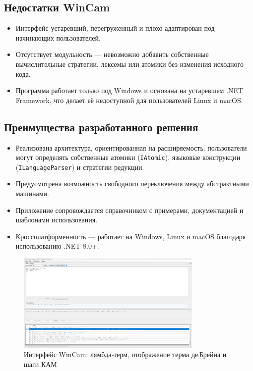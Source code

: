 \begin{itemize}
\subsection*{Недостатки WinCam}
\begin{itemize}
  \item Интерфейс устаревший, перегруженный и плохо адаптирован под начинающих пользователей.
  \item Отсутствует модульность — невозможно добавить собственные вычислительные стратегии, лексемы или атомики без изменения исходного кода.
  \item Программа работает только под Windows и основана на устаревшем .NET Framework, что делает её недоступной для пользователей Linux и macOS.
\end{itemize}

\subsection*{Преимущества разработанного решения}
\begin{itemize}
  \item Реализована архитектура, ориентированная на расширяемость: пользователи могут определять собственные атомики (\texttt{IAtomic}), языковые конструкции \\(\texttt{ILanguageParser}) и стратегии редукции.
  \item Предусмотрена возможность свободного переключения между абстрактными машинами.
  \item Приложение сопровождается справочником с примерами, документацией и шаблонами использования.
  \item Кроссплатформенность — работает на Windows, Linux и macOS благодаря использованию .NET 8.0+.
\end{itemize}

\begin{figure}[h]
  \centering
  \includegraphics[width=0.8\textwidth]{./img/WinCam.png}
  \caption{Интерфейс WinCam: лямбда‑терм, отображение терма де Брейна и шаги КАМ}
  \label{fig:wincam}
\end{figure}


\end{itemize}
